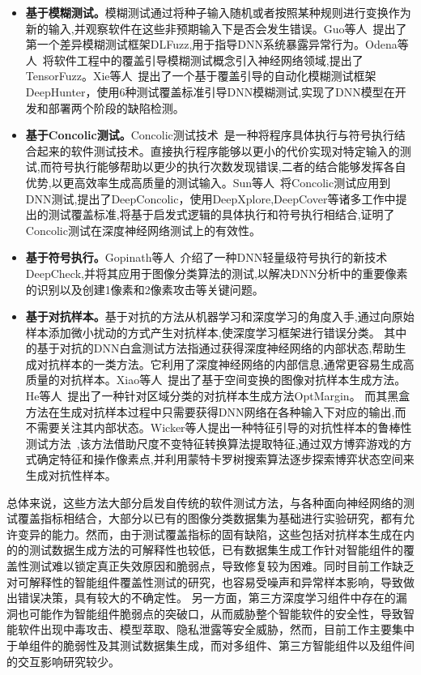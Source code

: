 \begin{itemize}
\item \textbf{基于模糊测试。}模糊测试通过将种子输入随机或者按照某种规则进行变换作为新的输入,并观察软件在这些非预期输入下是否会发生错误。Guo等人~提出了第一个差异模糊测试框架DLFuzz,用于指导DNN系统暴露异常行为。Odena等人~将软件工程中的覆盖引导模糊测试概念引入神经网络领域,提出了TensorFuzz。Xie等人~提出了一个基于覆盖引导的自动化模糊测试框架DeepHunter，使用6种测试覆盖标准引导DNN模糊测试,实现了DNN模型在开发和部署两个阶段的缺陷检测。

\item \textbf{基于Concolic测试。}Concolic测试技术~\cite{Majumdar2007Hybrid}是一种将程序具体执行与符号执行结合起来的软件测试技术。直接执行程序能够以更小的代价实现对特定输入的测试,而符号执行能够帮助以更少的执行次数发现错误,二者的结合能够发挥各自优势,以更高效率生成高质量的测试输入。Sun等人~将Concolic测试应用到DNN测试,提出了DeepConcolic，使用DeepXplore,DeepCover等诸多工作中提出的测试覆盖标准,将基于启发式逻辑的具体执行和符号执行相结合,证明了Concolic测试在深度神经网络测试上的有效性。

\item \textbf{基于符号执行。}Gopinath等人~介绍了一种DNN轻量级符号执行的新技术DeepCheck,并将其应用于图像分类算法的测试,以解决DNN分析中的重要像素的识别以及创建1像素和2像素攻击等关键问题。

\item \textbf{基于对抗样本。}基于对抗的方法从机器学习和深度学习的角度入手,通过向原始样本添加微小扰动的方式产生对抗样本,使深度学习框架进行错误分类。
其中的基于对抗的DNN白盒测试方法指通过获得深度神经网络的内部状态,帮助生成对抗样本的一类方法。它利用了深度神经网络的内部信息,通常更容易生成高质量的对抗样本。Xiao等人~提出了基于空间变换的图像对抗样本生成方法。He等人~提出了一种针对区域分类的对抗样本生成方法OptMargin。
而其黑盒方法在生成对抗样本过程中只需要获得DNN网络在各种输入下对应的输出,而不需要关注其内部状态。Wicker等人提出一种特征引导的对抗性样本的鲁棒性测试方法~,该方法借助尺度不变特征转换算法提取特征,通过双方博弈游戏的方式确定特征和操作像素点,并利用蒙特卡罗树搜索算法逐步探索博弈状态空间来生成对抗性样本。
\end{itemize}


总体来说，这些方法大部分启发自传统的软件测试方法，与各种面向神经网络的测试覆盖指标相结合，大部分以已有的图像分类数据集为基础进行实验研究，都有允许变异的能力。然而，由于测试覆盖指标的固有缺陷，这些包括对抗样本生成在内的的测试数据生成方法的可解释性也较低，已有数据集生成工作针对智能组件的覆盖性测试难以锁定真正失效原因和脆弱点，导致修复较为困难。同时目前工作缺乏对可解释性的智能组件覆盖性测试的研究，也容易受噪声和异常样本影响，导致做出错误决策，具有较大的不确定性。
另一方面，第三方深度学习组件中存在的漏洞也可能作为智能组件脆弱点的突破口，从而威胁整个智能软件的安全性，导致智能软件出现中毒攻击、模型萃取、隐私泄露等安全威胁，然而，目前工作主要集中于单组件的脆弱性及其测试数据集生成，而对多组件、第三方智能组件以及组件间的交互影响研究较少。







